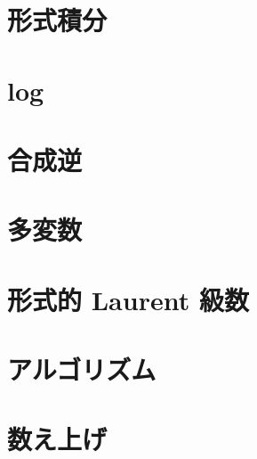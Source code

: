 \documentclass{jsarticle}
\theoremstyle{definition}
\begin{document}
\section{形式積分}
\section{log}
\section{合成逆}
\section{多変数}
\section{形式的 Laurent 級数}
\section{アルゴリズム}
\section{数え上げ}
\end{document}
